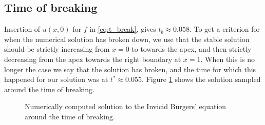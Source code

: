 \subsection{Time of breaking}
Insertion of $u(x, 0)$ for $f$ in \eqref{eq:t_break}, 
gives $t_b \approx 0.058$. 
To get a criterion for when the numerical solution has broken down, 
we use that the stable solution should be strictly increasing from $x=0$ to towards the apex, 
and then strictly decreasing from the apex towards the right boundary at $x=1$. 
When this is no longer the case we say that the solution has broken, 
and the time for which this happened for our solution was at $t^* \approx 0.055$. 
Figure \ref{fig:burgers-samples} shows the solution sampled around the time of breaking. 

\begin{figure}[ht]
    \centering
    
    \caption{Numerically computed solution to the Invicid Burgers' equation around the time of breaking.}
    \label{fig:burgers-samples}
\end{figure}
